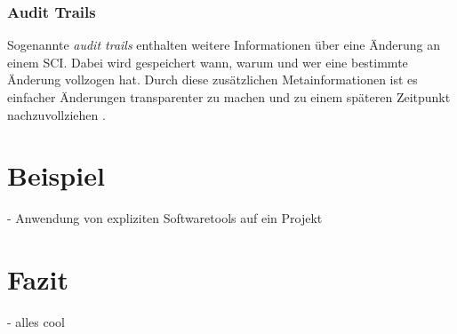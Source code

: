 \documentclass[runningheads,a4paper]{uwsese}
\begin{document}
\subsubsection{Audit Trails}
Sogenannte {\em audit trails} enthalten weitere Informationen über eine Änderung
an einem SCI. Dabei wird gespeichert wann, warum und wer eine bestimmte Änderung
vollzogen hat. Durch diese zusätzlichen Metainformationen ist es einfacher
Änderungen transparenter zu machen und zu einem späteren Zeitpunkt nachzuvollziehen
\cite[p. 592]{Pressman:2009:SEP:1593949}.

\section{Beispiel}
- Anwendung von expliziten Softwaretools auf ein Projekt

\section{Fazit}
- alles cool



\end{document}
